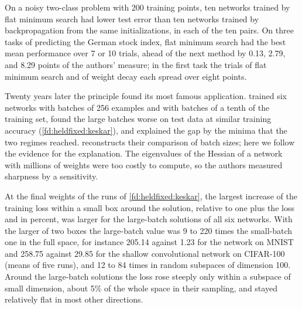 \begin{refsection}
\begin{finding}\label{fd:sharpness:fms}
On a noisy two-class problem with 200 training points, ten networks trained by flat minimum search had lower test error than ten networks trained by backpropagation from the same initializations, in each of the ten pairs. On three tasks of predicting the German stock index, flat minimum search had the best mean performance over 7 or 10 trials, ahead of the next method by 0.13, 2.79, and 8.29 points of the authors' measure; in the first task the trials of flat minimum search and of weight decay each spread over eight points.
\end{finding}

Twenty years later the principle found its most famous application. \Textcite{KeskarEtAl2017} trained six networks with batches of 256 examples and with batches of a tenth of the training set, found the large batches worse on test data at similar training accuracy (\cref{fd:heldfixed:keskar}), and explained the gap by the minima that the two regimes reached.  reconstructs their comparison of batch sizes; here we follow the evidence for the explanation. The eigenvalues of the Hessian of a network with millions of weights were too costly to compute, so the authors measured sharpness by a sensitivity.

\begin{finding}\label{fd:sharpness:keskar}
At the final weights of the runs of \cref{fd:heldfixed:keskar}, the largest increase of the training loss within a small box around the solution, relative to one plus the loss and in percent, was larger for the large-batch solutions of all six networks. With the larger of two boxes the large-batch value was 9 to 220 times the small-batch one in the full space, for instance 205.14 against 1.23 for the network on MNIST and 258.75 against 29.85 for the shallow convolutional network on CIFAR-100 (means of five runs), and 12 to 84 times in random subspaces of dimension 100. Around the large-batch solutions the loss rose steeply only within a subspace of small dimension, about 5\% of the whole space in their sampling, and stayed relatively flat in most other directions.
\end{finding}


\end{refsection}
